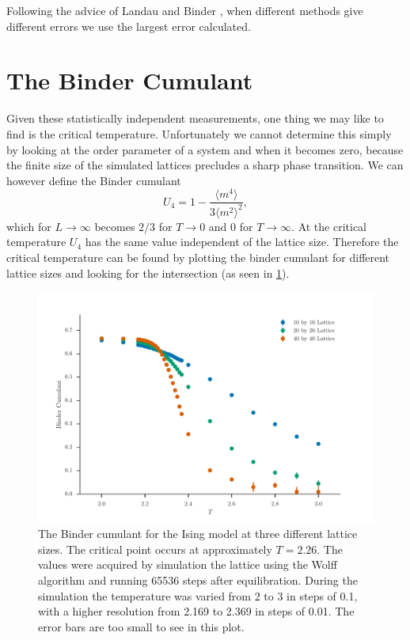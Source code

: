 \documentclass[11pt, a4paper]{report} %
\begin{document}
Following the advice of Landau and Binder \cite{landau:2015}, when different methods give different errors we use the largest error calculated.

\section{The Binder Cumulant}
Given these statistically independent measurements, one thing we may like to find is the critical temperature.
Unfortunately we cannot determine this simply by looking at the order parameter of a system and when it becomes zero, because the finite size of the simulated lattices precludes a sharp phase transition.
We can however define the Binder cumulant\cite{binder:1981b}
\begin{equation}
	U_4 = 1 - \frac{\langle m^4 \rangle}{3 \langle m^2 \rangle^2},
\end{equation}
which for \(L \to \infty\) becomes \(2/3\) for \(T \to 0\) and 0 for \(T \to \infty\).\cite{landau:2015}
At the critical temperature \(U_4\) has the same value independent of the lattice size.
Therefore the critical temperature can be found by plotting the binder cumulant for different lattice sizes and looking for the intersection (as seen in \cref{fig:ising_binder_cumulant}).
\begin{figure}[htb]
	\includegraphics[width=\textwidth]{wolff_binder_cumulant.pdf}
	\caption{The Binder cumulant for the Ising model at three different lattice sizes. The critical point occurs at approximately \(T = 2.26\). The values were acquired by simulation the lattice using the Wolff algorithm and running 65536 steps after equilibration. During the simulation the temperature was varied from 2 to 3 in steps of 0.1, with a higher resolution from 2.169 to 2.369 in steps of 0.01. The error bars are too small to see in this plot.}
	\label{fig:ising_binder_cumulant}
\end{figure}
\end{document}
